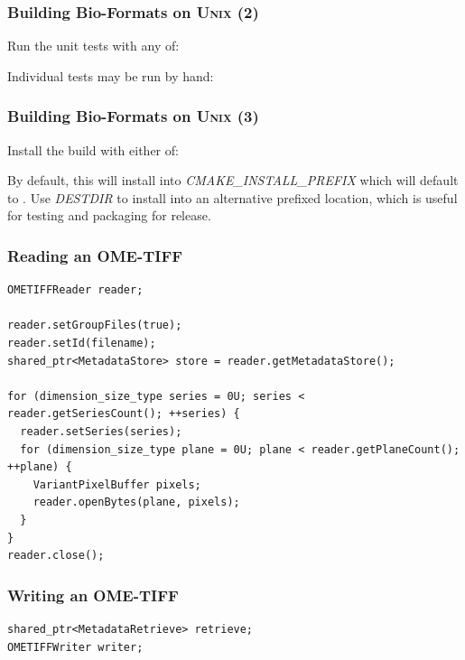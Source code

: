 \documentclass{beamer}
\newcommand{\opt}[1]{\textsl{#1}}
\begin{document}
\begin{frame}[fragile]
  \frametitle{Building Bio-Formats on U\textsc{nix} (2)}
  \scriptsize

Run the unit tests with any of:

  \begin{semiverbatim}
\end{semiverbatim}

Individual tests may be run by hand:

  \begin{semiverbatim}
\end{semiverbatim}

\begin{frame}[fragile]
  \frametitle{Building Bio-Formats on U\textsc{nix} (3)}
  \scriptsize

Install the build with either of:

  \begin{semiverbatim}
\end{semiverbatim}

By default, this will install into \opt{CMAKE\_INSTALL\_PREFIX} which
will default to .  Use \opt{DESTDIR} to install into
an alternative prefixed location, which is useful for testing and
packaging for release.
\end{frame}

\begin{frame}[fragile]
  \frametitle{Reading an OME-TIFF}
  \begin{lstlisting}
OMETIFFReader reader;

reader.setGroupFiles(true);
reader.setId(filename);
shared_ptr<MetadataStore> store = reader.getMetadataStore();

for (dimension_size_type series = 0U; series < reader.getSeriesCount(); ++series) {
  reader.setSeries(series);
  for (dimension_size_type plane = 0U; plane < reader.getPlaneCount(); ++plane) {
    VariantPixelBuffer pixels;
    reader.openBytes(plane, pixels);
  }
}
reader.close();
  \end{lstlisting}
\end{frame}

\begin{frame}[fragile]
  \frametitle{Writing an OME-TIFF}
  \begin{lstlisting}
shared_ptr<MetadataRetrieve> retrieve;
OMETIFFWriter writer;


\end{lstlisting}
\end{frame}
\end{frame}
\end{document}

